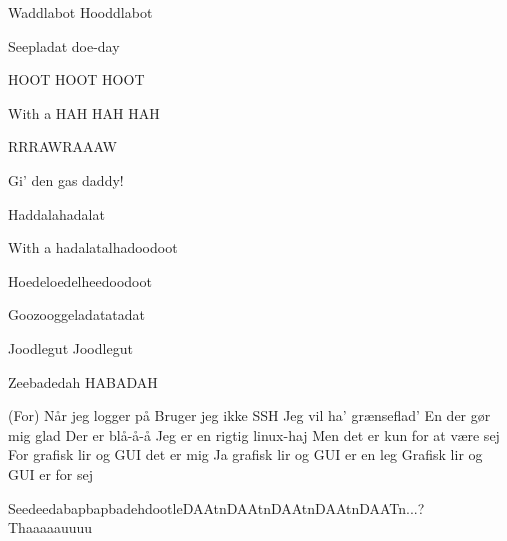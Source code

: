 \documentclass[a4paper,11pt]{article}
\begin{document}
\begin{song}
   Waddlabot Hooddlabot

   Seepladat doe-day

   HOOT HOOT HOOT

   With a HAH HAH HAH

   RRRAWRAAAW

   Gi' den gas daddy!

   Haddalahadalat

   With a hadalatalhadoodoot

   Hoedeloedelheedoodoot

   Goozooggeladatatadat

   Joodlegut Joodlegut

   Zeebadedah HABADAH

   (For) Når jeg logger på
  Bruger jeg ikke SSH
  Jeg vil ha' grænseflad'
  En der gør mig glad
  Der er blå-å-å
  Jeg er en rigtig linux-haj
  Men det er kun for at være sej
  For grafisk lir og GUI det er mig
  Ja grafisk lir og GUI er en leg
  Grafisk lir og GUI er for sej

   SeedeedabapbapbadehdootleDAAtnDAAtnDAAtnDAAtnDAATn...? Thaaaaauuuu
\end{song}
\end{document}
